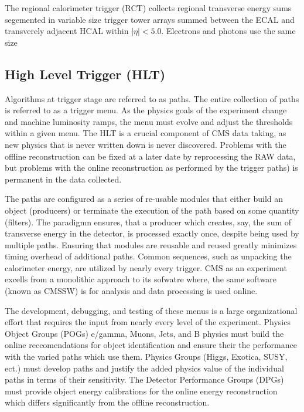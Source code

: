 {The regional calorimeter trigger (RCT) collects regional transverse energy sums segemented in variable size
 trigger tower arrays summed between the ECAL and transverely adjacent HCAL within $|\eta| < 5.0$. Electrons
and photons use the same size 

\subsection{High Level Trigger (HLT)}



Algorithms at trigger stage are referred to as paths. The entire collection of paths is referred to
 as a trigger menu. As the physics goals of the experiment change and machine luminosity ramps, 
the menu must evolve and adjust the thresholds within a given menu. The HLT is a crucial component of CMS data taking, as new physics that is never written down is never discovered. Problems with the offline
 reconstruction can be fixed at a later date by reprocessing the RAW data, but problems with the online reconstruction as performed by
the trigger paths) is permanent in the data collected. 

The paths are configured as a series of re-usable modules that either build an object (producers) 
or terminate the execution of the path based on some quantity (filters). The paradigmn ensures, that a producer which creates, say, the sum of transverse energy in the detector, is processed exactly once, despite being used by multiple paths. Ensuring that modules are reusable and reused greatly minimizes timing overhead of additional
paths. Common sequences, such as unpacking the calorimeter energy, are utilized by nearly every trigger. CMS as an experiment excells from a monolithic approach to its sofwatre where, the same software (known as CMSSW) is
 for analysis and data processing is used online.

The development, debugging, and testing of these menus
is a large organizational effort that requires the input from nearly every level of the experiment. 
Physics Object Groups (POGs)  e/gamma, Muons, Jets, and B physics must build
the online reccomendations for object identification and ensure their the performance with the varied 
paths which use them. Physics Groups (Higgs, Exotica, SUSY, ect.) must develop paths and justify the
added physics value of the individual paths in terms of their sensitivity. The Detector Performance Groups (DPGs) must provide object energy calibrations for the online energy reconstruction which differs significantly from
the offline reconstruction. 

}

